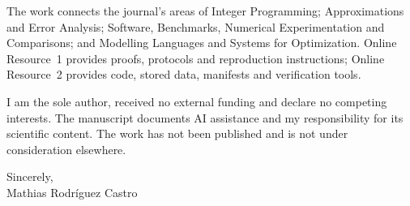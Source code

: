 \documentclass[11pt]{article}
\begin{document}
The work connects the journal's areas of Integer Programming; Approximations and Error
Analysis; Software, Benchmarks, Numerical Experimentation and Comparisons; and Modelling Languages and Systems for
Optimization. Online Resource~1 provides proofs, protocols and reproduction instructions;
Online Resource~2 provides code, stored data, manifests and verification tools.

I am the sole author, received no external funding and declare no competing interests.
The manuscript documents AI assistance and my responsibility for its scientific content.
The work has not been published and is not under consideration elsewhere.

\bigskip
\noindent Sincerely,\\[6pt]
Mathias Rodr\'iguez Castro
\end{document}
